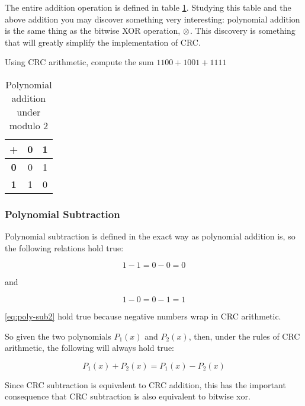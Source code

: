 The entire addition operation is defined in table
\ref{tab:poly-add}. Studying this table and the above addition you may
discover something very interesting: polynomial addition is the same
thing as the bitwise XOR operation, $\mathrel{\otimes}$. This discovery is
something that will greatly simplify the implementation of CRC.

\begin{Exercise}[label={poly-add}]
  Using CRC arithmetic, compute the sum  $1100 + 1001 + 1111$
\end{Exercise}

\begin{table}
  \centering
  \begin{tabular}{|c|c|c|}
    \hline
    \textbf{+} & \textbf{0} & \textbf{1} \\ \hline
    \textbf{0} & 0 & 1 \\ \hline
    \textbf{1} & 1 & 0 \\ \hline
  \end{tabular}
  \caption{Polynomial addition under modulo 2}
  \label{tab:poly-add}
\end{table}

\subsubsection{Polynomial Subtraction}

Polynomial subtraction is defined in the exact way as polynomial
addition is, so the following relations hold true:

\begin{equation}
  \label{eq:poly-sub1}
  1 - 1 = 0 - 0 = 0
\end{equation}

and

\begin{equation}
  \label{eq:poly-sub2}
  1 - 0 = 0 - 1 = 1
\end{equation}

\ref{eq:poly-sub2} hold true because negative numbers wrap in CRC
arithmetic.

So given the two polynomials $P_1(x)$ and $P_2(x)$, then, under the
rules of CRC arithmetic, the following will always hold true:

\begin{equation*}
  P_1(x) + P_2(x) = P_1(x) - P_2(x)
\end{equation*}


Since CRC subtraction is equivalent to CRC addition, this has the
important consequence that CRC subtraction is also equivalent to
bitwise xor.

